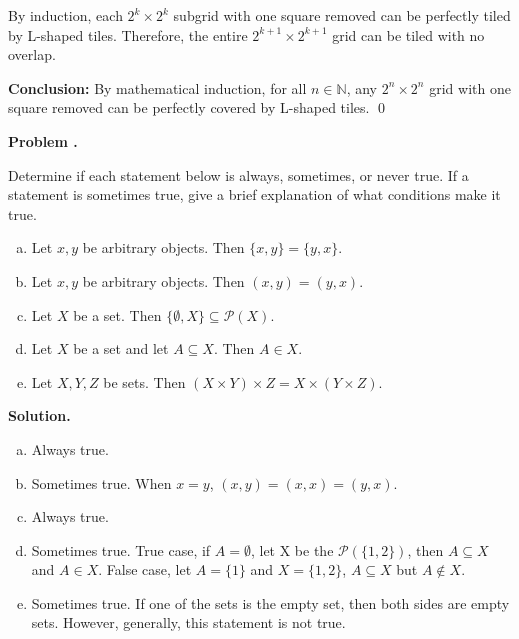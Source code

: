 \documentclass[12pt]{article}
\newcounter{HWcounter}
\newcommand{\problem}{\textbf{Problem  \theHWcounter.} \addtocounter{HWcounter}{1}}
\newcommand{\answer}{\vspace{2em} \textbf{Solution. }}
\newcommand{\N}{\mathbb{N}} %
\begin{document}
\begin{center}
\end{center}


By induction, each $2^k \times 2^k$ subgrid with one square removed can be perfectly tiled by L-shaped tiles.
Therefore, the entire $2^{k+1} \times 2^{k+1}$ grid can be tiled with no overlap.

\textbf{Conclusion:}
By mathematical induction, for all $n \in \N$, any $2^n \times 2^n$ grid with one square removed can be perfectly covered by L-shaped tiles.
\qed







\newpage
\problem Determine if each statement below is always, sometimes, or never true. If a statement is sometimes true, give a brief explanation of what conditions make it true.

\begin{enumerate}[(a)]
    \item Let $x,y$ be arbitrary objects. Then $\{x,y\} = \{y,x\}$.
    \item Let $x,y$ be arbitrary objects. Then $(x,y) = (y,x)$.
    \item Let $X$  be a set. Then $\{ \emptyset, X\} \subseteq \mathscr{P}(X)$.
    \item Let $X$ be a set and let $A \subseteq X$. Then $A \in X$.
    \item Let $X,Y,Z$ be sets. Then $(X \times Y) \times Z = X \times (Y \times Z)$.
\end{enumerate}

\answer  %
\begin{enumerate}[(a)]
    \item Always true.
    \item Sometimes true. When $x=y$, $(x,y) = (x, x)=(y,x)$.
    \item Always true.
    \item Sometimes true. True case, if $A = \emptyset$, let X be the $\mathscr{P}(\{1, 2\})$, then $A \subseteq X$ and $A \in X$. False case, let $A= \{1\}$ and $X= \{1,2\}$, $A \subseteq X$ but $A \notin X$. 
    \item Sometimes true. If one of the sets is the empty set, then both sides are empty sets. However, generally, this statement is not true.
\end{enumerate}
\end{document}
